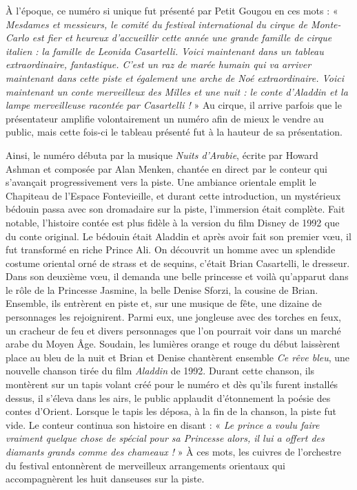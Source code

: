 À l’époque, ce numéro si unique fut présenté par Petit Gougou en ces mots : «\textit{ Mesdames et messieurs, le comité du festival international du cirque de Monte-Carlo est fier et heureux d’accueillir cette année une grande famille de cirque italien : la famille de Leonida Casartelli. Voici maintenant dans un tableau extraordinaire, fantastique. C’est un raz de marée humain qui va arriver maintenant dans cette piste et également une arche de Noé extraordinaire. Voici maintenant un conte merveilleux des Milles et une nuit : le conte d’Aladdin et la lampe merveilleuse racontée par Casartelli !} » Au cirque, il arrive parfois que le présentateur amplifie volontairement un numéro afin de mieux le vendre au public, mais cette fois-ci le tableau présenté fut à la hauteur de sa présentation. 

Ainsi, le numéro débuta par la musique \textit{Nuits d’Arabie}, écrite par Howard Ashman et composée par Alan Menken, chantée en direct par le conteur qui s’avançait progressivement vers la piste. Une ambiance orientale emplit le Chapiteau de l’Espace Fontevieille, et durant cette introduction, un mystérieux bédouin passa avec son dromadaire sur la piste, l’immersion était complète. Fait notable, l’histoire contée est plus fidèle à la version du film Disney de 1992 que du conte original. Le bédouin était Aladdin et après avoir fait son premier vœu, il fut transformé en riche Prince Ali. On découvrit un homme avec un splendide costume oriental orné de strass et de sequins, c’était Brian Casartelli, le dresseur. Dans son deuxième vœu, il demanda une belle princesse et voilà qu’apparut dans le rôle de la Princesse Jasmine, la belle Denise Sforzi, la cousine de Brian. Ensemble, ils entrèrent en piste et, sur une musique de fête, une dizaine de personnages les rejoignirent. Parmi eux, une jongleuse avec des torches en feux, un cracheur de feu et divers personnages que l’on pourrait voir dans un marché arabe du Moyen Âge. Soudain, les lumières orange et rouge du début laissèrent place au bleu de la nuit et Brian et Denise chantèrent ensemble \textit{Ce rêve bleu}, une nouvelle chanson tirée du film \textit{Aladdin} de 1992. Durant cette chanson, ils montèrent sur un tapis volant créé pour le numéro et dès qu’ils furent installés dessus, il s’éleva dans les airs, le public applaudit d’étonnement la poésie des contes d’Orient. Lorsque le tapis les déposa, à la fin de la chanson, la piste fut vide. Le conteur continua son histoire en disant : « \textit{Le prince a voulu faire vraiment quelque chose de spécial pour sa Princesse alors, il lui a offert des diamants grands comme des chameaux !} » À ces mots, les cuivres de l’orchestre du festival entonnèrent de merveilleux arrangements orientaux qui accompagnèrent les huit danseuses sur la piste. 

